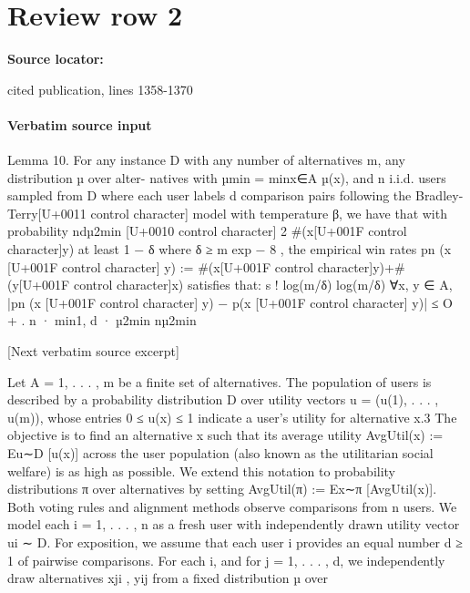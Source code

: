 \documentclass[10pt]{article}
\begin{document}
\section*{Review row 2}
\textbf{Source locator:} {\footnotesize\raggedright cited publication, lines 1358-\allowbreak{}1370\par}
\paragraph{Verbatim source input}
\begin{ReviewVerbatim}
Lemma 10. For any instance D with any number of alternatives m, any distribution µ over alter-
natives with µmin = minx∈A µ(x), and n i.i.d. users sampled from D where each user labels d
comparison pairs following the Bradley-Terry[U+0011 control character] model with temperature β, we have that with probability
                                    ndµ2min
                                [U+0010 control character]
                          2                                                                #(x[U+001F control character]y)
at least 1 − δ where δ ≥ m exp − 8           , the empirical win rates pn (x [U+001F control character] y) := #(x[U+001F control character]y)+#(y[U+001F control character]x)
satisfies that:
                                                     s                                      !
                                                              log(m/δ)            log(m/δ)
        ∀x, y ∈ A, |pn (x [U+001F control character] y) − p(x [U+001F control character] y)| ≤ O                                  +             .
                                                         n · min{1, d · µ2min }     nµ2min


[Next verbatim source excerpt]

Let A = {1, . . . , m} be a finite set of alternatives. The population of users is described by a
probability distribution D over utility vectors u = (u(1), . . . , u(m)), whose entries 0 ≤ u(x) ≤ 1
indicate a user’s utility for alternative x.3 The objective is to find an alternative x such that its average
utility AvgUtil(x) := Eu∼D [u(x)] across the user population (also known as the utilitarian social
welfare) is as high as possible. We extend this notation to probability distributions π over alternatives
by setting AvgUtil(π) := Ex∼π [AvgUtil(x)].
Both voting rules and alignment methods observe comparisons from n users. We model each
i = 1, . . . , n as a fresh user with independently drawn utility vector ui ∼ D. For exposition, we
assume that each user i provides an equal number d ≥ 1 of pairwise comparisons. For each i,
and for j = 1, . . . , d, we independently draw alternatives xji , yij from a fixed distribution µ over


\end{ReviewVerbatim}
\end{document}
